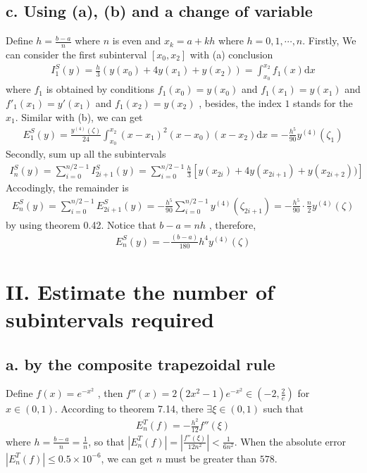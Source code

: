 \documentclass[twoside,a4paper]{article}
\newcommand{\dif}{\mathrm{d}}
\begin{document}
\subsection*{c. Using (a), (b) and a change of variable}
Define $h=\frac{b-a}{n}$ where $n$ is even and $x_k=a+kh$ where $h=0,1,\cdots,n$. Firstly, We can consider the first subinterval $[x_0,x_2]$ with (a) conclusion
\begin{gather}
I_1^{S}(y)=\frac{h}{3}(y(x_0)+4y(x_1)+y(x_2)) = \int_{x_0}^{x_2} f_1(x) \dif x
\end{gather}
where $f_1$ is obtained by conditions $f_1(x_0)=y(x_0)$ and $f_1(x_1)=y(x_1)$ and $f'_1(x_1)=y'(x_1)$ and $f_1(x_2) = y(x_2)$ , besides, the index $1$ stands for the $x_1$. Similar with (b), we can get
\begin{gather}
E^S_1(y)=\frac{y^{(4)}(\zeta)}{24} \int_{x_0}^{x_2} (x-x_1)^2(x-x_0)(x-x_2) \dif x =- \frac{h^5}{90}y^{(4)}(\zeta_1)
\end{gather} 
Secondly, sum up all the subintervals
\begin{gather}
I^S_n(y)=\sum_{i=0}^{n/2-1}I_{2i+1}^S(y)=\sum_{i=0}^{n/2-1}\frac{h}{3}[y(x_{2i})+4y(x_{2i+1})+y(x_{2i+2}))] 
\end{gather}
Accodingly, the remainder is 
\begin{gather}
E^S_n(y)=\sum_{i=0}^{n/2-1} E_{2i+1}^S(y) =-\frac{h^5}{90} \sum_{i=0}^{n/2-1}y^{(4)}(\zeta_{2i+1})=-\frac{h^5}{90}\cdot \frac{n}{2}y^{(4)}(\zeta)
\end{gather}
by using theorem 0.42. Notice that $b-a=nh$ , therefore, 
\begin{gather}
E^S_n(y)=-\frac{(b-a)}{180}h^4y^{(4)}(\zeta)
\end{gather}
\section*{II. Estimate the number of subintervals required}
\subsection*{a. by the composite trapezoidal rule}
Define $f(x)=e^{-x^2}$ , then $f''(x)=2(2x^2-1)e^{-x^2} \in (-2,\frac{2}{e})$ for $x \in (0,1)$. According to theorem 7.14, there $\exists \xi \in (0,1)$ such that
\begin{gather}
E^T_n(f)=-\frac{h^2}{12}f''(\xi)
\end{gather}
where $h=\frac{b-a}{n}=\frac{1}{n}$, so that $|E^T_n(f)|=|\frac{f''(\xi)}{12n^2}| <\frac{1}{6n^2}$. When the absolute error $|E^T_n(f)| \leq 0.5\times10^{-6}$, we can get $n$ must be greater than $578$.
\end{document}
